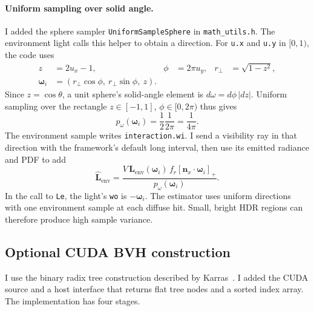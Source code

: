 \documentclass[acmtog]{acmart}
\begin{document}
\paragraph{Uniform sampling over solid angle.}
I added the sphere sampler \texttt{UniformSampleSphere} in \texttt{math\_utils.h}. The environment light calls this helper to obtain a direction. For \texttt{u.x} and \texttt{u.y} in $[0,1)$, the code uses
\begin{align}
z &= 2u_x-1, &
\phi &= 2\pi u_y, &
r_\perp &= \sqrt{1-z^2},\\
\boldsymbol\omega_i &=
(r_\perp\cos\phi,\ r_\perp\sin\phi,\ z).
\end{align}
Since $z=\cos\theta$, a unit sphere's solid-angle element is $d\omega=d\phi\,|dz|$. Uniform sampling over the rectangle $z\in[-1,1]$, $\phi\in[0,2\pi)$ thus gives
\begin{equation}
p_\omega(\boldsymbol\omega_i)=\frac{1}{2}\frac{1}{2\pi}
=\frac{1}{4\pi}.
\end{equation}
The environment sample writes \texttt{interaction.wi}. I send a visibility ray in that direction with the framework's default long interval, then use its emitted radiance and PDF to add
\begin{equation}
\widehat{\mathbf L}_{\mathrm{env}}
=\frac{V\,\mathbf L_{\mathrm{env}}(\boldsymbol\omega_i)\,
       f_r[\mathbf n_x\cdot\boldsymbol\omega_i]_+}{p_\omega(\boldsymbol\omega_i)} .
\end{equation}
In the call to \texttt{Le}, the light's \texttt{wo} is $-\boldsymbol\omega_i$. The estimator uses uniform directions with one environment sample at each diffuse hit. Small, bright HDR regions can therefore produce high sample variance.

\subsection{Optional CUDA BVH construction}
I use the binary radix tree construction described by Karras~\cite{karras2012}. I added the CUDA source and a host interface that returns flat tree nodes and a sorted index array. The implementation has four stages.
\end{document}
